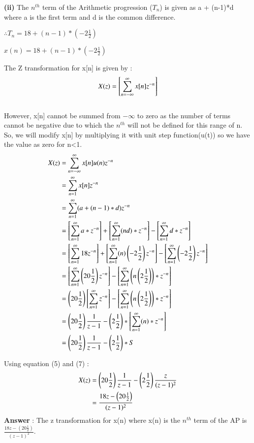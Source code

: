 \documentclass[journal,12pt,twocolumn]{IEEEtran}
\theoremstyle{remark}
\begin{document}
\textbf{(ii)} The \(n^{th}\) term of the Arithmetic progression ($T_{n}$) is given as a + (n-1)*d where a is the first term and d is the common difference.

$\therefore T_{n} = 18 + (n-1)*\left(-2\frac{1}{2}\right) $

$x(n) = 18 + (n-1)*\left(-2\frac{1}{2}\right)$

The Z transformation for x[n] is given by : \\
\begin{align}
X(z) =\left[ \sum_{n=-\infty}^{\infty}x[n]z^{-n}\right]\notag
\end{align}
\\
However, x[n] cannot be summed from $-\infty$ to zero as the number of terms cannot be negative due to which the $n^{th}$ will not be defined for this range of n.\\
So, we will modify x[n] by multiplying it with unit step function(u(t)) so we have the value as zero for n<1.
\begin{align}
X(z) &= \sum_{n=-\infty}^{\infty}x[n] u(n) z^{-n} \\
 &= \sum_{n=1}^{\infty}x[n]z^{-n}\notag\\
 &= \sum_{n=1}^{\infty}(a+(n-1)*d)z^{-n} \notag\\
 &=  \left[\sum_{n=1}^{\infty}a*z^{-n} \right] + \left[ \sum_{n=1}^{\infty}(nd)*z^{-n} \right] - \left[ \sum_{n=1}^{\infty}d*z^{-n} \right]\notag\\
 &=  \left[\sum_{n=1}^{\infty}18z^{-n} \right] + \left[ \sum_{n=1}^{\infty}(n)\left(-2\frac{1}{2}\right)z^{-n} \right] - \left[ \sum_{n=1}^{\infty}\left(-2\frac{1}{2}\right)z^{-n} \right]\notag\\
 &=  \left[\sum_{n=1}^{\infty}\left(20\frac{1}{2}\right)z^{-n} \right] - \left[ \sum_{n=1}^{\infty}\left(n\left(2\frac{1}{2}\right)\right)*z^{-n} \right]\notag\\
 &= \left(20\frac{1}{2}\right)\left[\sum_{n=1}^{\infty}z^{-n} \right] - \left[ \sum_{n=1}^{\infty}\left(n\left(2\frac{1}{2}\right)\right)*z^{-n} \right]\notag\\
 &= \left(20\frac{1}{2}\right)\frac{1}{z-1} - \left(2\frac{1}{2}\right)*\left[ \sum_{n=1}^{\infty}(n)*z^{-n} \right]\notag\\
 &= \left(20\frac{1}{2}\right)\frac{1}{z-1} - \left(2\frac{1}{2}\right)*S
\end{align}

Using equation (5) and (7) : \\
\begin{align}
X(z) &=  \left(20\frac{1}{2}\right)\frac{1}{z-1} - \left(2\frac{1}{2}\right)\frac{z}{(z-1)^2}\notag\\
&= \frac{18z - \left(20\frac{1}{2}\right)}{(z-1)^2}\notag
\end{align}
\large\textbf{Answer} : \normalsize The z transformation for x(n) where x(n) is the $n^{th}$ term of the AP is $\frac{18z - \left(20\frac{1}{2}\right)}{(z-1)^2}$.
\end{document}
